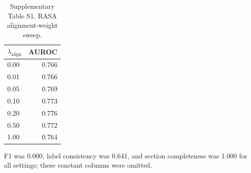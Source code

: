 \begin{table}[t]
  \centering
  \caption{Supplementary Table S1. RASA alignment-weight sweep.}
  \label{tab:s1_rasa_lambda_align_sweep}
  \small
  \begin{threeparttable}
  \begin{tabular}{lr}
    \toprule
    \textbf{$\lambda_{\mathrm{align}}$} & \textbf{AUROC} \\
    \midrule
    0.00 & 0.766 \\
    0.01 & 0.766 \\
    0.05 & 0.769 \\
    0.10 & 0.773 \\
    0.20 & 0.776 \\
    0.50 & 0.772 \\
    1.00 & 0.764 \\
    \bottomrule
  \end{tabular}
  \begin{tablenotes}[flushleft]
    \footnotesize
    \item F1 was 0.000, label consistency was 0.641, and section completeness was 1.000 for all settings; these constant columns were omitted.
  \end{tablenotes}
  \end{threeparttable}
\end{table}


